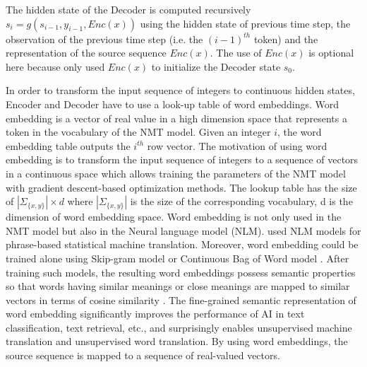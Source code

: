 The hidden state of the Decoder is computed recursively $s_i = g(s_{i-1},y_{i-1},Enc(x))$ using the hidden state of previous time step, the observation of the previous time step (i.e. the $(i-1)^{th}$ token) and the representation of the source sequence $Enc(x)$. The use of $Enc(x)$ is optional here because \cite{Sutskever14sequence} only used $Enc(x)$ to initialize the Decoder state $s_0$.

In order to transform the input sequence of integers to continuous hidden states, Encoder and Decoder have to use a look-up table of word embeddings. Word embedding is a vector of real value in a high dimension space that represents a token in the vocabulary of the NMT model. Given an integer $i$, the word embedding table outputs the $i^{th}$ row vector. The motivation of using word embedding is to transform the input sequence of integers to a sequence of vectors in a continuous space which allows training the parameters of the NMT model with gradient descent-based optimization methods. The lookup table has the size of $|\Sigma_{\{x,y\}}| \times d$ where $|\Sigma_{\{x,y\}}|$ is the size of the corresponding vocabulary, d is the dimension of word embedding space. Word embedding is not only used in the NMT model but also in the Neural language model \cite{Bengio03aneural}(NLM). \cite{Le12continuous, Schwenk12continuous} used NLM models for phrase-based statistical machine translation. Moreover, word embedding could be trained alone using Skip-gram model \citep{Mikolov13distributed} or Continuous Bag of Word model \cite{Mikolov13efficient}. After training such models, the resulting word embeddings possess semantic properties so that words having similar meanings or close meanings are mapped to similar vectors in terms of cosine similarity \citep{Collobert11natural, Mikolov13distributed, collobert08aunified}. The fine-grained semantic representation of word embedding significantly improves the performance of AI in text classification, text retrieval, etc., and surprisingly enables unsupervised machine translation and unsupervised word translation. By using word embeddings, the source sequence is mapped to a sequence of real-valued vectors. 

